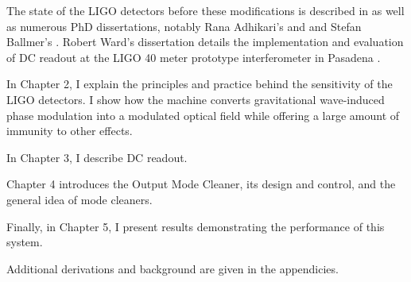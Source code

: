 The state of the LIGO detectors before these modifications is
described in \cite{S5InstrumentPaper} as well as numerous PhD
dissertations, notably Rana Adhikari's \cite{RanaThesis} and and
Stefan Ballmer's \cite{Ballmer2006LIGO}.  Robert Ward's dissertation
details the implementation and evaluation of DC readout at the LIGO 40
meter prototype interferometer in Pasadena \cite{RobWardThesis}.

In Chapter 2, I explain the principles and practice behind the
sensitivity of the LIGO detectors.  I show how the machine converts
gravitational wave-induced phase modulation into a modulated optical
field while offering a large amount of immunity to other effects.

In Chapter 3, I describe DC readout.

Chapter 4 introduces the Output Mode Cleaner, its design and control,
and the general idea of mode cleaners.

Finally, in Chapter 5, I present results demonstrating the performance
of this system.

Additional derivations and background are given in the appendicies.

